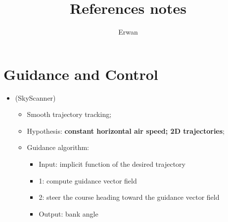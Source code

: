\documentclass[]{article}
\begin{document}
\title{References notes}
\author{Erwan}

\maketitle

\section*{Guidance and Control}
\begin{itemize}
	\item \cite{de2016guidance} (SkyScanner)
	\begin{itemize}
		\item Smooth trajectory tracking;
		\item Hypothesis: \textbf{constant horizontal air speed; 2D trajectories};
		\item Guidance algorithm:
		\begin{itemize}
			\item Input: implicit function of the desired trajectory
			\item 1: compute guidance vector field
			\item 2: steer the course heading toward the guidance vector field
			\item Output: bank angle
		\end{itemize}
	\end{itemize}
\end{itemize}
\end{document}
